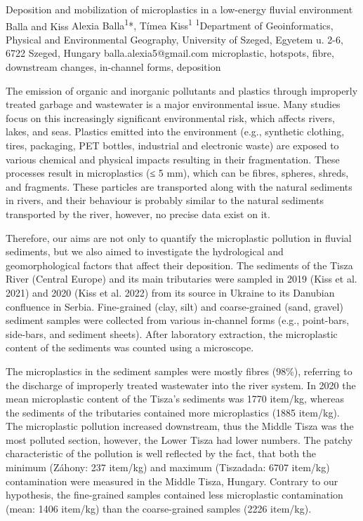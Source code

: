 \abstract
{Deposition and mobilization of microplastics in a low-energy fluvial environment} 
{Balla and Kiss} 
{Alexia Balla\textsuperscript{1}*, Tímea Kiss\textsuperscript{1}} 
{\TLtag} 
{
\textsuperscript{1}Department of Geoinformatics, Physical and Environmental Geography, University of Szeged, Egyetem u. 2-6, 6722 Szeged, Hungary
}
{balla.alexia5@gmail.com}  %
{microplastic, hotspots, fibre, downstream changes, in-channel forms, deposition}
{The emission of organic and inorganic pollutants and plastics through improperly treated garbage and wastewater is a major environmental issue. Many studies focus on this increasingly significant environmental risk, which affects rivers, lakes, and seas. Plastics emitted into the environment (e.g., synthetic clothing, tires, packaging, PET bottles, industrial and electronic waste) are exposed to various chemical and physical impacts resulting in their fragmentation. These processes result in microplastics (≤ 5 mm), which can be fibres, spheres, shreds, and fragments. These particles are transported along with the natural sediments in rivers, and their behaviour is probably similar to the natural sediments transported by the river, however, no precise data exist on it. 

Therefore, our aims are not only to quantify the microplastic pollution in fluvial sediments, but we also aimed to investigate the hydrological and geomorphological factors that affect their deposition. The sediments of the Tisza River (Central Europe) and its main tributaries were sampled in 2019 (Kiss et al. 2021) and 2020 (Kiss et al. 2022) from its source in Ukraine to its Danubian confluence in Serbia. Fine-grained (clay, silt) and coarse-grained (sand, gravel) sediment samples were collected from various in-channel forms (e.g., point-bars, side-bars, and sediment sheets). After laboratory extraction, the microplastic content of the sediments was counted using a microscope.

The microplastics in the sediment samples were mostly fibres (98\%), referring to the discharge of improperly treated wastewater into the river system. In 2020 the mean microplastic content of the Tisza’s sediments was 1770 item/kg, whereas the sediments of the tributaries contained more microplastics (1885 item/kg). The microplastic pollution increased downstream, thus the Middle Tisza was the most polluted section, however, the Lower Tisza had lower numbers. The patchy characteristic of the pollution is well reflected by the fact, that both the minimum (Záhony: 237 item/kg) and maximum (Tiszadada: 6707 item/kg) contamination were measured in the Middle Tisza, Hungary.
Contrary to our hypothesis, the fine-grained samples contained less microplastic contamination (mean: 1406 item/kg) than the coarse-grained samples (2226 item/kg). 

}
